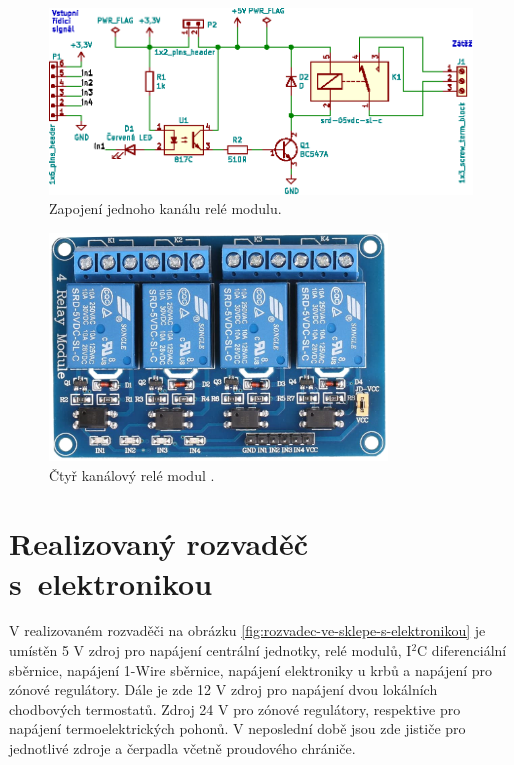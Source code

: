 \begin{figure}[H]
    \centering
    \includegraphics[width=\textwidth]{images/svg/kicad/rele-modul-jeden-kanal.eps}
    \caption{Zapojení jednoho kanálu relé modulu.}
    \label{fig:rele-modul-jeden-kanal}
\end{figure}


\begin{figure}[H]
    \centering
    \includegraphics[width=0.8\textwidth]{images/ctyr-kanalovy-rele-modul.png}
    \caption[Čtyř kanálový relé modul.]{Čtyř kanálový relé modul \cite{ctyr-kanalovy-rele-modul}.}
    \label{fig:ctyr-kanalovy-rele-modul}
\end{figure}

\section{Realizovaný rozvaděč s~elektronikou}

V realizovaném rozvaděči na obrázku \ref{fig:rozvadec-ve-sklepe-s-elektronikou} je umístěn 5 V zdroj pro napájení centrální jednotky, relé modulů, I$^2$C diferenciální sběrnice, napájení 1-Wire sběrnice, napájení elektroniky u krbů a napájení pro zónové regulátory. Dále je zde 12 V zdroj pro napájení dvou lokálních chodbových termostatů. Zdroj 24 V pro zónové regulátory, respektive pro napájení termoelektrických pohonů. V  neposlední době jsou zde jističe pro jednotlivé zdroje a čerpadla včetně proudového chrániče.

